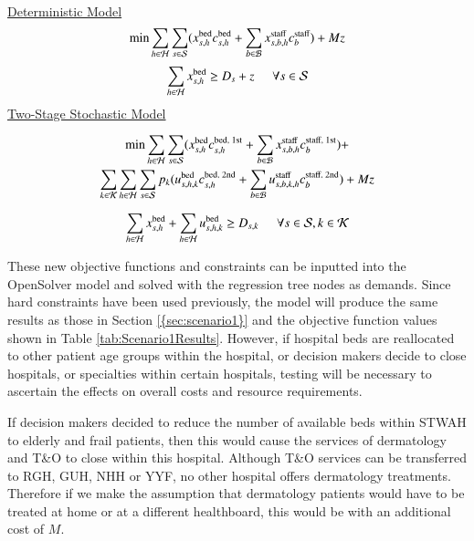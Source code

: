 \documentclass[../thesis.tex]{subfiles}
\begin{document}
\underline{Deterministic Model}
\begin{equation}\label{eq:det_objective}
    \min \sum_{h\in\mathcal{H}}\sum_{s\in\mathcal{S}}(x^\textnormal{bed}_{s,h}c^\textnormal{bed}_{s,h} + \sum_{b\in\mathcal{B}}x^\textnormal{staff}_{s,b,h}c^\textnormal{staff}_{b}) + Mz
\end{equation}
\begin{equation}
    \sum_{h\in\mathcal{H}} x^\textnormal{bed}_{s,h}\geq D_{s} + z \hspace{0.5cm} \forall  s \in \mathcal{S}
\end{equation}
\underline{Two-Stage Stochastic Model}

\begin{multline}\label{eq:sto_objectiveupdate}
    \min \sum_{h\in\mathcal{H}}\sum_{s\in\mathcal{S}}(x^\textnormal{bed}_{s,h}c^\textnormal{bed, 1st}_{s,h} + \sum_{b\in\mathcal{B}}x^\textnormal{staff}_{s,b,h}c^\textnormal{staff, 1st}_{b}) +\\ 
    \sum_{k\in\mathcal{K}}\sum_{h\in\mathcal{H}}\sum_{s\in\mathcal{S}}p_{k}(u^\textnormal{bed}_{s,h,k}c^\textnormal{bed, 2nd}_{s,h} +
   \sum_{b\in\mathcal{B}} u^\textnormal{staff}_{s,b,k,h}c^\textnormal{staff, 2nd}_{b}) + Mz
\end{multline}

\begin{equation}
    \sum_{h\in\mathcal{H}} x^\textnormal{bed}_{s,h} +  \sum_{h\in\mathcal{H}} u^\textnormal{bed}_{s,h,k} \geq D_{s,k} \hspace{0.5cm} \forall s \in \mathcal{S}, k \in \mathcal{K}\\
\end{equation}

These new objective functions and constraints can be inputted into the OpenSolver model and solved with the regression tree nodes as demands. Since hard constraints have been used previously, the model will produce the same results as those in Section \ref{{sec:scenario1}} and the objective function values shown in Table \ref{tab:Scenario1Results}. However, if hospital beds are reallocated to other patient age groups within the hospital, or decision makers decide to close hospitals, or specialties within certain hospitals, testing will be necessary to ascertain the effects on overall costs and resource requirements.


If decision makers decided to reduce the number of available beds within STWAH to elderly and frail patients, then this would cause the services of dermatology and T\&O to close within this hospital. Although T\&O services can be transferred to RGH, GUH, NHH or YYF, no other hospital offers dermatology treatments. Therefore if we make the assumption that dermatology patients would have to be treated at home or at a different healthboard, this would be with an additional cost of $M$.
\end{document}

